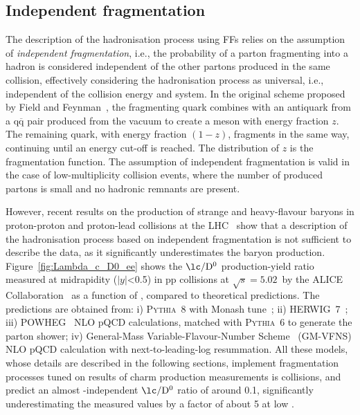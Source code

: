 \subsection{Independent fragmentation}\label{sec:independent_fragmentation}
The description of the hadronisation process using FFs relies on the assumption of \emph{independent fragmentation}, i.e., the probability of a parton fragmenting into a hadron is considered independent of the other partons produced in the same collision, effectively considering the hadronisation process as universal, i.e., independent of the collision energy and system. In the original scheme proposed by Field and Feynman~\cite{Field:1976ve}, the fragmenting quark combines with an antiquark from a $\mathrm{q\overline{q}}$ pair produced from the vacuum to create a meson with energy fraction $z$. The remaining quark, with energy fraction $(1-z)$, fragments in the same way, continuing until an energy cut-off is reached. The distribution of $z$ is the fragmentation function. The assumption of independent fragmentation is valid in the case of low-multiplicity \ee collision events, where the number of produced partons is small and no hadronic remnants are present.

However, recent results on the production of strange and heavy-flavour baryons in proton-proton and proton-lead collisions at the LHC~\cite{ALICE:2020wla,ALICE:2024ozd} show that a description of the hadronisation process based on independent fragmentation is not sufficient to describe the data, as it significantly underestimates the baryon production. Figure~\ref{fig:Lambda_c_D0_ee} shows the $\mathrm{\lc/D^0}$ production-yield ratio measured at midrapidity ($\lvert y\rvert$<0.5) in pp collisions at $\sqrt{s} = 5.02$~\tev by the ALICE Collaboration~\cite{ALICE:2020wla} as a function of \pt, compared to theoretical predictions. The predictions are obtained from: i) \textsc{Pythia}~8 with Monash tune~\cite{Skands:2014pea}; ii) HERWIG~7~\cite{Bellm:2015jjp}; iii) POWHEG~\cite{Frixione:2007nw} NLO pQCD calculations, matched with \textsc{Pythia}~6 to generate the parton shower; iv) General-Mass Variable-Flavour-Number Scheme~\cite{Kniehl:2005mk} (GM-VFNS) NLO pQCD calculation with next-to-leading-log resummation. All these models, whose details are described in the following sections, implement fragmentation processes tuned on results of charm production measurements is \ee collisions, and predict an almost \pt-independent $\mathrm{\lc/D^0}$ ratio of around 0.1, significantly underestimating the measured values by a factor of about 5 at low \pt.


